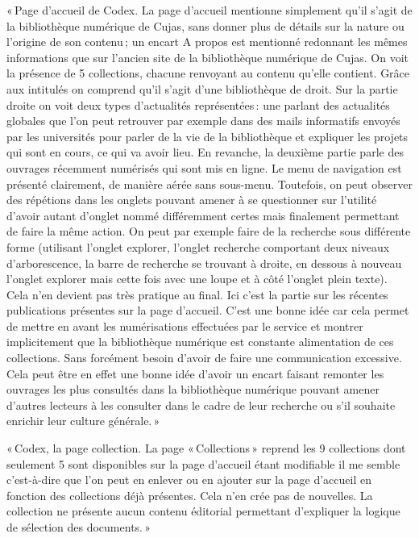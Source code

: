 « Page d’accueil de Codex. La page d’accueil mentionne simplement qu’il s’agit de la bibliothèque numérique de Cujas, sans donner plus de détails sur la nature ou l’origine de son contenu ; un encart A propos est mentionné redonnant les mêmes informations que sur l’ancien site de la bibliothèque numérique de Cujas. On voit la présence de 5 collections, chacune renvoyant au contenu qu’elle contient. Grâce aux intitulés on comprend qu’il s’agit d’une bibliothèque de droit. Sur la partie droite on voit deux types d’actualités représentées : une parlant des actualités globales que l’on peut retrouver par exemple dans des mails informatifs envoyés par les universités pour parler de la vie de la bibliothèque et expliquer les projets qui sont en cours, ce qui va avoir lieu. En revanche, la deuxième partie parle des ouvrages récemment numérisés qui sont mis en ligne. Le menu de navigation est présenté clairement, de manière aérée sans sous-menu. Toutefois, on peut observer des répétions dans les onglets pouvant amener à se questionner sur l’utilité d’avoir autant d’onglet nommé différemment certes mais finalement permettant de faire la même action. On peut par exemple faire de la recherche sous différente forme (utilisant l’onglet explorer, l’onglet recherche comportant deux niveaux d’arborescence, la barre de recherche se trouvant à droite, en dessous à nouveau l’onglet explorer mais cette fois avec une loupe et à côté l’onglet plein texte). Cela n’en devient pas très pratique au final. Ici c’est la partie sur les récentes publications présentes sur la page d’accueil. C’est une bonne idée car cela permet de mettre en avant les numérisations effectuées par le service et montrer implicitement que la bibliothèque numérique est constante alimentation de ces collections. Sans forcément besoin d’avoir de faire une communication excessive. Cela peut être en effet une bonne idée d’avoir un encart faisant remonter les ouvrages les plus consultés dans la bibliothèque numérique pouvant amener d’autres lecteurs à les consulter dans le cadre de leur recherche ou s’il souhaite enrichir leur culture générale. »  

« Codex, la page collection. La page « Collections » reprend les 9 collections dont seulement 5 sont disponibles sur la page d’accueil étant modifiable il me semble c’est-à-dire que l’on peut en enlever ou en ajouter sur la page d’accueil en fonction des collections déjà présentes. Cela n’en crée pas de nouvelles. La collection ne présente aucun contenu éditorial permettant d'expliquer la logique de sélection des documents. » 

